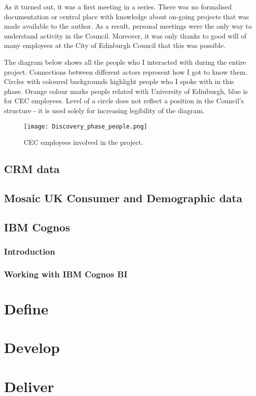 As it turned out, it was a first meeting in a series. There was no formalised documentation or central place with knowledge about on-going projects that was made available to the author. As a result, personal meetings were the only way to understand activity in the Council. Moreover, it was only thanks to good will of many employees at the City of Edinburgh Council that this was possible.

The diagram below shows all the people who I interacted with during the entire project. Connections between different actors represent how I got to know them. Circles with coloured backgrounds highlight people who I spoke with in this phase. Orange colour marks people related with University of Edinburgh, blue is for CEC employees. Level of a circle does not reflect a position in the Council’s structure - it is used solely for increasing legibility of the diagram.

\begin{figure}[h]
\centering
     \texttt{[image: Discovery\_phase\_people.png]}
      \caption{CEC employees involved in the project.}
       \label{normal_case}
\end{figure}
		
		\subsection{CRM data}
		
		\subsection{Mosaic UK Consumer and Demographic data}
		
		\subsection{IBM Cognos}
		
			\subsubsection{Introduction}
			
			\subsubsection{Working with IBM Cognos BI}

	\section{Define}

	\section{Develop}
	
	\section{Deliver}